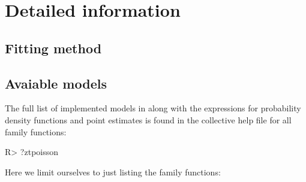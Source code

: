 \documentclass[
]{jss}
\newcommand{\1}{\mathmybb{1}} \newcommand{\bx}{\boldsymbol{x}}
\begin{document}
\hypertarget{detailed-information}{%
\section{Detailed information}\label{detailed-information}}

\hypertarget{fitting-method}{%
\subsection{Fitting method}\label{fitting-method}}

\hypertarget{avaiable-models}{%
\subsection{Avaiable models}\label{avaiable-models}}

The full list of implemented models in  along with
the expressions for probability density functions and point estimates is
found in the collective help file for all family functions:

\begin{CodeChunk}
\begin{CodeInput}
R> ?ztpoisson
\end{CodeInput}
\end{CodeChunk}

Here we limit ourselves to just listing the family functions:
\end{document}
